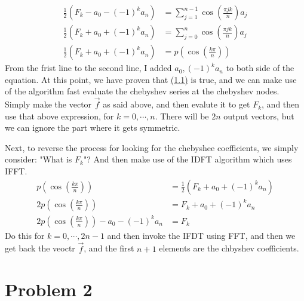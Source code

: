 \documentclass[]{article}
\begin{document}
    \begin{align*}\tag{1.5}\label{eqn:1.5}
        \frac{1}{2}
        \left(
            F_k - a_0 - (-1)^ka_n
        \right) &= 
        \sum_{j = 1}^{n - 1}
        \cos \left(
            \frac{\pi j k}{n}
        \right)a_j
        \\
        \frac{1}{2}
        \left(
            F_k + a_0 + (-1)^ka_n
        \right) &= 
        \sum_{j = 0}^{n}
        \cos \left(
            \frac{\pi j k}{n}
        \right)a_j
        \\
        \frac{1}{2}
        \left(
            F_k + a_0 + (-1)^ka_n
        \right) &= p\left(
            \cos\left(
                \frac{k\pi}{n}
            \right)
        \right)
    \end{align*}
    From the frist line to the second line, I added $a_0, (-1)^ka_n$ to both side of the equation. At this point, we have proven that \hyperref[eqn:1.1]{(1.1)} is true, and we can make use of the algorithm fast evaluate the chebyshev series at the chebyshev nodes. Simply make the vector $\vec{f}$ as said above, and then evalute it to get $F_k$, and then use that above expression, for $k = 0, \cdots, n$. There will be $2n$ output vectors, but we can ignore the part where it gets symmetric. 
    \par
    Next, to reverse the process for looking for the chebyshee coefficients, we simply consider: "What is $F_k$"? And then make use of the IDFT algorithm which uses IFFT. 
    \begin{align*}\tag{1.6}\label{eqn:1.6}
        p\left(
            \cos\left(
                \frac{k\pi}{n}
            \right)
        \right) &= 
        \frac{1}{2}
        \left(
            F_k + a_0 + (-1)^ka_n
        \right)
        \\
        2 p\left(
            \cos \left(
                \frac{k\pi }{n}
            \right)
        \right)  
        &= F_k + a_0 + (-1)^ka_n
        \\
        2 p\left(
            \cos \left(
                \frac{k\pi }{n}
            \right)
        \right) - a_0 - (-1)^ka_n
        &= F_k
    \end{align*}
    Do this for $k = 0, \cdots, 2n - 1$ and then invoke the IFDT using FFT, and then we get back the veoctr $\vec{f}$, and the first $n + 1$ elements are the chbyshev coefficients. 

\section*{Problem 2}
\end{document}
